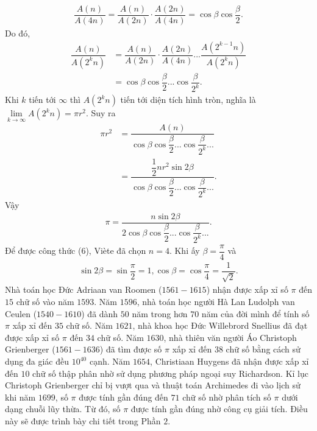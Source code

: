 \begin{multicols}{2}
\begin{align*}
		\dfrac{{A(n)}}{{A(4n)}} = \dfrac{{A(n)}}{{A(2n)}}\cdot\dfrac{{A(2n)}}{{A(4n)}} = \cos \beta \cos \dfrac{\beta }{2}.
	\end{align*}
	Do đó,
	\begin{align*}
			\dfrac{{A(n)}}{{A({2^k}n)}} &= \dfrac{{A(n)}}{{A(2n)}}\cdot\dfrac{{A(2n)}}{{A(4n)}}...\dfrac{{A\left( {{2^{k - 1}}n} \right)}}{{A({2^k}n)}}\\
			&= \cos \beta \cos \dfrac{\beta }{2}...\cos \dfrac{\beta }{{{2^k}}}.
	\end{align*}
	Khi $k$  tiến tới $\infty$  thì $A({2^k}n)$  tiến tới diện tích hình tròn, nghĩa là $\mathop {\lim }\limits_{k \to \infty } A({2^k}n) = \pi {r^2}.$ Suy ra  
	\begin{align*}
		\pi {r^2} &= \dfrac{{A(n)}}{{\cos \beta \cos \dfrac{\beta }{2}...\cos \dfrac{\beta }{{{2^k}}}...}} \\
		&= \dfrac{{\dfrac{1}{2}n{r^2}\sin 2\beta }}{{\cos \beta \cos \dfrac{\beta }{2}...\cos \dfrac{\beta }{{{2^k}}}...}}.
	\end{align*}
	Vậy  
	\begin{align*}
		\pi  = \dfrac{{n\sin 2\beta }}{{2\cos \beta \cos \dfrac{\beta }{2}...\cos \dfrac{\beta }{{{2^k}}}...}}.
	\end{align*}
	Để được công thức ($6$), Viète đã chọn $n = 4$. Khi ấy $\beta  = \dfrac{\pi }{4}$  và 
	\begin{align*}
		\sin 2\beta  = \sin \dfrac{\pi }{2} = 1, \cos \beta  = \cos \dfrac{\pi }{4} = \dfrac{1}{{\sqrt 2 }}.
	\end{align*}
	Nhà toán học Đức Adriaan van Roomen ($1561-1615$) nhận được xấp xỉ số  $\pi$ đến $15$ chữ số vào năm $1593$.
	\vskip 0.1cm 
	Năm $1596$, nhà toán học người Hà Lan Ludolph van Ceulen ($1540-1610$) đã dành $50$ năm trong hơn $70$ năm của đời mình để tính số $\pi$   xấp xỉ đến $35$ chữ số.
	\vskip 0.1cm 
	Năm $1621$, nhà khoa học Đức Willebrord Snellius đã đạt được xấp xỉ số $\pi$  đến $34$ chữ số.
	\vskip 0.1cm
	Năm $1630$, nhà thiên văn người Áo Christoph Grienberger ($1561-1636$) đã tìm được số $\pi$ xấp xỉ đến $38$ chữ số bằng cách sử dụng đa giác đều  $10^{40}$ cạnh.
	\vskip 0.1cm 
	Năm $1654$, Christiaan Huygens đã nhận được xấp xỉ đến $10$ chữ số thập phân nhờ sử dụng phương pháp ngoại suy Richardson.  
	\vskip 0.1cm
	Kỉ lục Christoph Grienberger chỉ bị vượt qua và thuật toán Archimedes đi vào lịch sử khi năm $1699$, số  $\pi$ được tính gần đúng đến $71$ chữ số nhờ phân tích số  $\pi$ dưới dạng chuỗi lũy thừa. Từ đó, số $\pi$ được tính gần đúng nhờ công cụ giải tích. Điều này sẽ được trình bày chi tiết trong Phần $2$.

\end{multicols}
